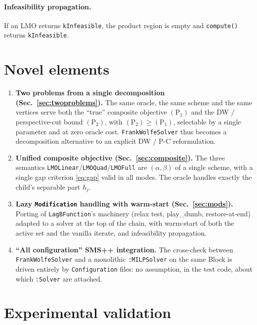 \documentclass[11pt,a4paper]{article}
\newcommand{\code}[1]{\texttt{#1}}
\newcommand{\Pone}{(\mathrm{P}_1)}
\newcommand{\Ptwo}{(\mathrm{P}_2)}
\theoremstyle{plain}
\theoremstyle{remark}
\begin{document}
\paragraph{Infeasibility propagation.} If an LMO returns \code{kInfeasible}, the
product region is empty and \code{compute()} returns \code{kInfeasible}.

\section{Novel elements}\label{sec:novelty}

\begin{enumerate}[leftmargin=1.4em]
\item \textbf{Two problems from a single decomposition (Sec.~\ref{sec:twoproblems}).}
  The same oracle, the same scheme and the same vertices serve both the ``true''
  composite objective $\Pone$ and the DW / perspective-cut bound $\Ptwo$, with
  $\Ptwo\ge\Pone$, selectable by a single parameter and at zero oracle cost.
  \code{FrankWolfeSolver} thus becomes a decomposition alternative to an explicit
  DW / P-C reformulation.
\item \textbf{Unified composite objective (Sec.~\ref{sec:composite}).} The three
  semantics \code{LMOLinear}/\code{LMOQuad}/\code{LMOFull} are $(\alpha,\beta)$ of
  a single scheme, with a single gap criterion \eqref{eq:gap} valid in all modes.
  The oracle handles exactly the child's separable part $h_j$.
\item \textbf{Lazy \code{Modification} handling with warm-start (Sec.~\ref{sec:mods}).}
  Porting of \code{LagBFunction}'s machinery (relax test, play\_dumb,
  restore-at-end) adapted to a solver at the top of the chain, with warm-start of
  both the active set and the vanilla iterate, and infeasibility propagation.
\item \textbf{``All configuration'' SMS++ integration.} The cross-check between
  \code{FrankWolfeSolver} and a monolithic \code{:MILPSolver} on the same Block is
  driven entirely by \code{Configuration} files: no assumption, in the test code,
  about which \code{:Solver} are attached.
\end{enumerate}

\section{Experimental validation}\label{sec:valid}
\end{document}
